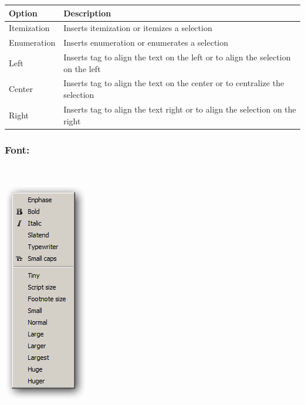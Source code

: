 \begin{scriptsize}\begin{tabularx}{\textwidth}{>{\hsize=0.2\hsize}X>{\hsize=0.8\hsize}X}\\
    \hline
    \textbf{Option} & \textbf{Description} \\
    \hline
    Itemization & Inserts itemization or itemizes a selection \\
    Enumeration & Inserts enumeration or enumerates a selection \\
    Left & Inserts tag to align the text on the left or to align the selection on the left \\
    Center & Inserts tag to align the text on the center or to centralize the selection \\
    Right & Inserts tag to align the text right or to align the selection on the right \\
    \hline
  \end{tabularx}\end{scriptsize}


\hypertarget{menu_insert_latex_font}{}
\subsubsection{Font:}\\

\includegraphics[scale=0.50]{./res/menu_insert_latex_font.png}\\

